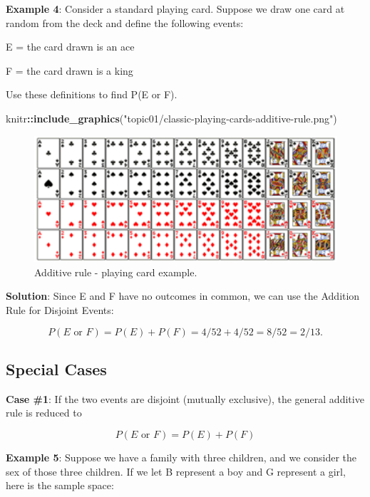 \documentclass[
]{book}
\newenvironment{Shaded}{\begin{snugshade}}{\end{snugshade}}
\newcommand{\FunctionTok}[1]{\textcolor[rgb]{0.13,0.29,0.53}{\textbf{#1}}}
\newcommand{\NormalTok}[1]{#1}
\newcommand{\SpecialCharTok}[1]{\textcolor[rgb]{0.81,0.36,0.00}{\textbf{#1}}}
\newcommand{\StringTok}[1]{\textcolor[rgb]{0.31,0.60,0.02}{#1}}
\begin{document}
\textbf{Example 4}: Consider a standard playing card. Suppose we draw one card at random from the deck and define the following events:

E = the card drawn is an ace

F = the card drawn is a king

Use these definitions to find P(E or F).

\begin{Shaded}
\begin{Highlighting}[]
\NormalTok{knitr}\SpecialCharTok{::}\FunctionTok{include\_graphics}\NormalTok{(}\StringTok{"topic01/classic{-}playing{-}cards{-}additive{-}rule.png"}\NormalTok{)}
\end{Highlighting}
\end{Shaded}

\begin{figure}

{\centering \includegraphics[width=0.6\linewidth]{topic01/classic-playing-cards-additive-rule} 

}

\caption{Additive rule - playing card example.}\label{fig:unnamed-chunk-24}
\end{figure}

\textbf{Solution}: Since E and F have no outcomes in common, we can use the Addition Rule for Disjoint Events:

\[P(E \mbox{ or } F) = P(E) + P(F) = 4/52 + 4/52 = 8/52 = 2/13.\]

\hypertarget{special-cases}{%
\subsection{Special Cases}\label{special-cases}}

\textbf{Case \#1}: If the two events are disjoint (mutually exclusive), the general additive rule is reduced to

\[P(E \mbox{ or } F) = P(E) + P(F)\]

\textbf{Example 5}: Suppose we have a family with three children, and we consider the sex of those three children. If we let B represent a boy and G represent a girl, here is the sample space:
\end{document}
